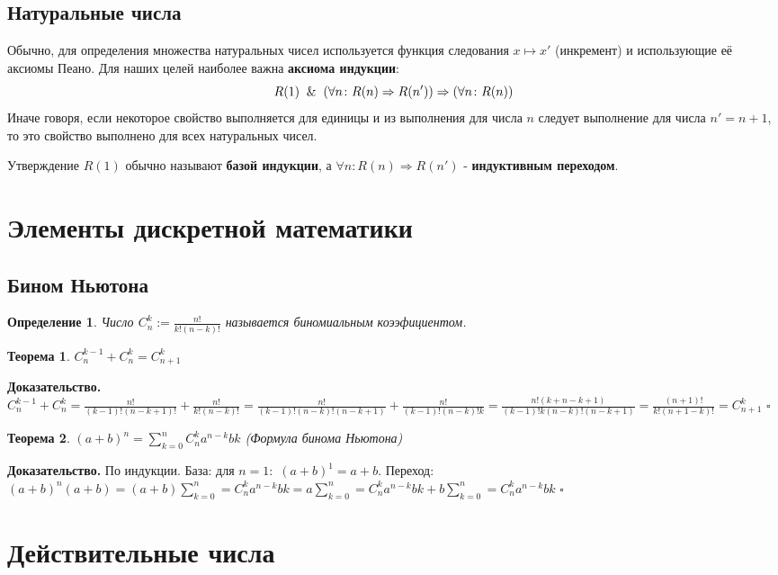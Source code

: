 \documentclass[a4paper]{article}
\newtheorem{defin}{Определение}
\newtheorem{theor}{Теорема}
\begin{document}
\subsection{Натуральные числа}
Обычно, для определения множества натуральных чисел используется функция 
следования $x\mapsto x'$ (инкремент) и использующие её аксиомы Пеано. Для 
наших целей наиболее важна \textbf{аксиома индукции}:
$$R(1)\And(\forall n\colon R(n)\Rightarrow R(n'))\Rightarrow(\forall n\colon
R(n))$$
Иначе говоря, если некоторое свойство выполняется для единицы и из выполнения
для числа $n$ следует выполнение для числа $n'=n+1$, то это свойство выполнено
для всех натуральных чисел. 

Утверждение $R(1)$ обычно называют \textbf{базой индукции}, а $\forall n\colon
R(n)\Rightarrow R(n')$ - \textbf{индуктивным переходом}.
\section{Элементы дискретной математики}
\subsection{Бином Ньютона}

\begin{defin}
Число $C_n^k:=\frac{n!}{k!(n-k)!}$ называется биномиальным коээфициентом.
\end{defin}

\begin{theor}
$C^{k-1}_n+C^{k}_n=C^k_{n+1}$
\end{theor}
\textbf{Доказательство.} $C^{k-1}_n+C^{k}_n=\frac{n!}{(k-1)!(n-k+1)!}+\frac{n!}
{k!(n-k)!}=\frac{n!}{(k-1)!(n-k)!(n-k+1)}+\frac{n!}{(k-1)!(n-k)!k}=
\frac{n!(k+n-k+1)}{(k-1)!k(n-k)!(n-k+1)}=\frac{(n+1)!}{k!(n+1-k)!}=C^k_{n+1}$ 
$\square$

\begin{theor}
$(a+b)^n=\sum\limits^n_{k=0}C^k_na^{n-k}b{k}$ (Формула бинома Ньютона)
\end{theor}
\textbf{Доказательство.} По индукции. База: для $n=1:$ $(a+b)^1=a+b$. Переход:
$(a+b)^n(a+b)=(a+b)\sum\limits^n_{k=0}=C^k_na^{n-k}b{k}=a\sum\limits^n_{k=0}=
C^k_na^{n-k}b{k}+b\sum\limits^n_{k=0}=C^k_na^{n-k}b{k}$  $\square$


\section{Действительные числа}
\end{document}
